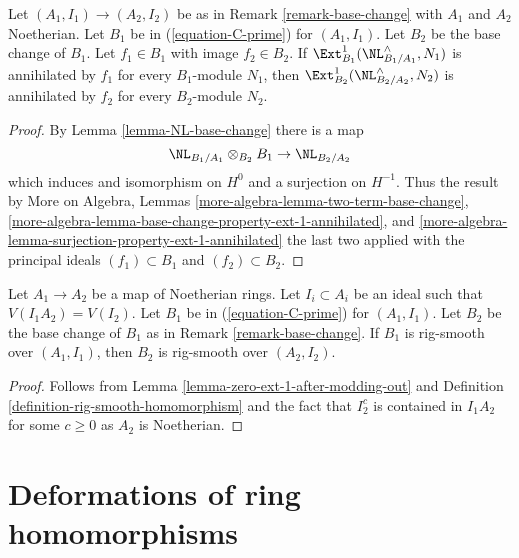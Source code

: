 \begin{lemma}
\label{lemma-zero-ext-1-after-modding-out}
Let $(A_1, I_1) \to (A_2, I_2)$ be as in
Remark \ref{remark-base-change} with $A_1$ and $A_2$ Noetherian.
Let $B_1$ be in (\ref{equation-C-prime}) for $(A_1, I_1)$.
Let $B_2$ be the base change of $B_1$. Let $f_1 \in B_1$
with image $f_2 \in B_2$.
If $\Ext^1_{B_1}(\NL_{B_1/A_1}^\wedge, N_1)$ is annihilated
by $f_1$ for every $B_1$-module $N_1$, then
$\Ext^1_{B_2}(\NL_{B_2/A_2}^\wedge, N_2)$ is annihilated
by $f_2$ for every $B_2$-module $N_2$.
\end{lemma}

\begin{proof}
By Lemma \ref{lemma-NL-base-change} there is a map
$$
\NL_{B_1/A_1} \otimes_{B_2} B_1 \to \NL_{B_2/A_2}
$$
which induces and isomorphism on $H^0$ and a surjection on $H^{-1}$.
Thus the result by More on Algebra, Lemmas
\ref{more-algebra-lemma-two-term-base-change},
\ref{more-algebra-lemma-base-change-property-ext-1-annihilated}, and
\ref{more-algebra-lemma-surjection-property-ext-1-annihilated}
the last two applied with the principal ideals $(f_1) \subset B_1$ and
$(f_2) \subset B_2$.
\end{proof}

\begin{lemma}
\label{lemma-base-change-rig-smooth-homomorphism}
Let $A_1 \to A_2$ be a map of Noetherian rings. Let $I_i \subset A_i$
be an ideal such that $V(I_1A_2) = V(I_2)$. Let $B_1$ be in
(\ref{equation-C-prime}) for $(A_1, I_1)$.
Let $B_2$ be the base change of $B_1$ as in
Remark \ref{remark-base-change}.
If $B_1$ is rig-smooth over $(A_1, I_1)$,
then $B_2$ is rig-smooth over $(A_2, I_2)$.
\end{lemma}

\begin{proof}
Follows from Lemma \ref{lemma-zero-ext-1-after-modding-out} and
Definition \ref{definition-rig-smooth-homomorphism}
and the fact that $I_2^c$ is contained in $I_1A_2$ for some $c \geq 0$
as $A_2$ is Noetherian.
\end{proof}













\section{Deformations of ring homomorphisms}
\label{section-defos-ring-maps}

